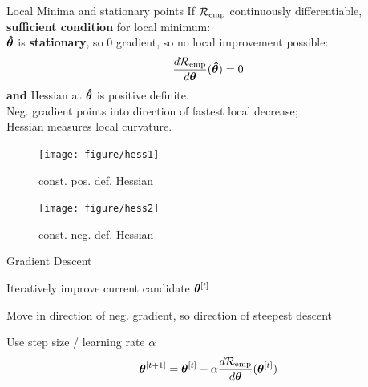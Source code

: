 \documentclass[11pt,compress,t,notes=noshow, xcolor=table]{beamer}
\begin{document}
\begin{frame2}[fs=footnotesize]{Local Minima and stationary points}
If $\mathcal{R}_{\text{emp}}$ continuously differentiable, \textbf{sufficient condition} for local minimum: \\
$\bm{\hat\theta}$ is \textbf{stationary}, so 0 gradient, so no local improvement possible:
$$
\frac{d \mathcal{R}_{\text{emp}}}{d\bm{\theta}}(\bm{\hat\theta}) = 0
$$
\textbf{and} Hessian at $\bm{\hat\theta}$ is positive definite. \\
Neg. gradient points into direction of fastest local decrease;\\
Hessian measures local curvature.
\vfill
\begin{figure}[!htb]
{
\texttt{[image: figure/hess1]}
\caption*{\footnotesize const. pos. def. Hessian}
}
{
\texttt{[image: figure/hess2]}
\caption*{\footnotesize const. neg. def. Hessian}
}
\end{figure}
\end{frame2}


\begin{framei}{Gradient Descent}
\item Iteratively improve  current candidate $\bm{\theta}^{[t]}$ 
\item Move in direction of  neg. gradient, so direction of steepest descent
\item Use step size / learning rate $\alpha$ 
$$
\bm{\theta}^{[t+1]} = \bm{\theta}^{[t]} - \alpha \frac{d \mathcal{R}_{\text{emp}}}{d\bm{\theta}}{(\bm{\theta}^{[t]})}
$$
\end{framei}
\end{document}

